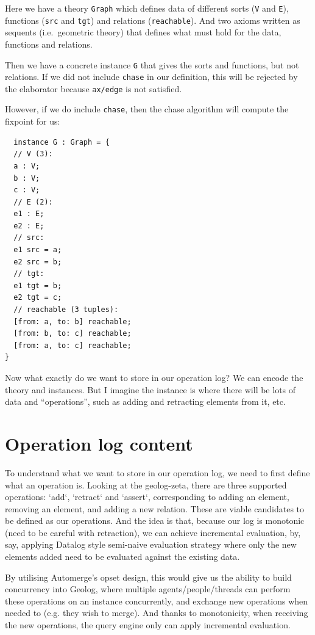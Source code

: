 \documentclass[12pt,a4paper,twoside]{article}
\begin{document}
Here we have a theory \verb|Graph| which defines data of different sorts (\verb|V| and
\verb|E|), functions (\verb|src| and \verb|tgt|) and relations (\verb|reachable|). 
And two axioms written as sequents (i.e.\ geometric theory) that defines what 
must hold for the data, functions and relations.

Then we have a concrete instance \verb|G| that gives the sorts and functions, but not
relations. If we did not include \verb|chase| in our definition, this will be rejected
by the elaborator because \verb|ax/edge| is not satisfied.

However, if we do include \verb|chase|, then the chase algorithm will compute the
fixpoint for us:

\begin{verbatim}
  instance G : Graph = {
  // V (3):
  a : V;
  b : V;
  c : V;
  // E (2):
  e1 : E;
  e2 : E;
  // src:
  e1 src = a;
  e2 src = b;
  // tgt:
  e1 tgt = b;
  e2 tgt = c;
  // reachable (3 tuples):
  [from: a, to: b] reachable;
  [from: b, to: c] reachable;
  [from: a, to: c] reachable;
} 
\end{verbatim}

Now what exactly do we want to store in our operation log? We can encode the theory
and instances. But I imagine the instance is where there will be lots of data
and ``operations'', such as adding and retracting elements from it, etc.

\section{Operation log content}

To understand what we want to store in our operation log, we need to first define
what an operation is. Looking at the geolog-zeta, there are three supported operations:
`add`, `retract` and `assert`, corresponding to adding an element, removing an
element, and adding a new relation. These are viable candidates to be defined
as our operations. And the idea is that, because our log is monotonic (need to
be careful with retraction), we can achieve incremental evaluation, by, say,
applying Datalog style semi-naive evaluation strategy where only the new elements
added need to be evaluated against the existing data.

By utilising Automerge's opset design, this would give us the ability to build
concurrency into Geolog, where multiple agents/people/threads can perform these
operations on an instance concurrently, and exchange new operations when needed
to (e.g. they wish to merge). And thanks to monotonicity, when receiving the new 
operations, the query engine only can apply incremental evaluation.
\end{document}
